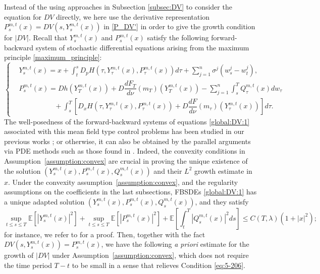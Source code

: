 \documentclass[11pt]{article}
\numberwithin{equation}{section}
\newcommand{\e}{\mathbb{E}}
\newcommand{\1}{\mbox{1\hspace{-1mm}I}}
\begin{document}
Instead of the using approaches in Subsection \ref{subsec:DV} to consider the equation for $DV$ directly, we here use the derivative representation $P^{m,t}_s(x)=DV\left(s,Y^{m,t}_s(x)\right)$ in \eqref{P_DV'} in order to give the growth condition for $|DV|$. Recall that $Y^{m,t}_s(x)$ and $P^{m,t}_s(x)$ satisfy the following forward-backward system of stochastic differential equations arising from the maximum principle \eqref{maximum_principle}:
\begin{equation}\label{global:DV:1}
    \left\{
    \begin{aligned}
        &Y^{m,t}_s(x)=x+\int_t^s D_{p}H\left(\tau,Y^{m,t}_\tau(x),P^{m,t}_\tau(x)\right)d\tau+\sum_{j=1}^{n}\sigma^{j} \left(w^{j}_s-w^{j}_t\right),\\
        &P^{m,t}_s(x)= Dh\left(Y^{m,t}_T(x)\right)+D\dfrac{dF_{T}}{d\nu}\left(m_T\right)\left(Y^{m,t}_T(x)\right) - \sum_{j=1}^{n}\int_s^T Q^{m,t}_\tau(x) dw_\tau\\
        &\quad\qquad\qquad +\int_s^T \left[D_{x}H\left(\tau,Y^{m,t}_\tau(x),P^{m,t}_\tau(x)\right)+D\dfrac{dF}{d\nu}\left(m_\tau\right)\left(Y^{m,t}_\tau(x)\right)\right] d\tau.
    \end{aligned}
    \right.
\end{equation}
The well-posedness of the forward-backward systems of equations \eqref{global:DV:1} associated with this mean field type control problems has been studied in our previous works \cite{AB10,AB5}; or otherwise, it can also be obtained by the parallel arguments via PDE methods such as those found in \cite{Delarue2002,Ma-Yong}. Indeed, the convexity conditions in Assumption~\ref{assumption:convex} are crucial in proving the unique existence of the solution $\left(Y^{m,t}_s(x),P^{m,t}_s(x),Q^{m,t}_s(x)\right)$ and their $L^2$ growth estimate in $x$. Under the convexity assumption~\ref{assumption:convex}, and the regularity assumptions on the coefficients in the last subsections, FBSDEs \eqref{global:DV:1} has a unique adapted solution $\left(Y^{m,t}_s(x),P^{m,t}_s(x),Q^{m,t}_s(x)\right)$, and they satisfy
\begin{equation*}\label{estimate:YPQ}
    \sup_{t\le s\le T}\e\left[\left| { Y^{m,t}_s(x)}\right|^2 \right] + \sup_{t\le s\le T}\e\left[\left| { P^{m,t}_s(x)}\right|^2\right]+\e\left[\int_t^T \left| { Q^{m,t}_s(x)}\right|^2 ds \right] \le C(T,\lambda)\left(1+|x|^2\right);
\end{equation*}
for instance, we refer to \cite[Section 8]{AB10} for a proof. Then, together with the fact $DV\left(s,Y^{m,t}_s(x)\right)=P^{m,t}_s(x)$, we have the following \textit{a priori} estimate for the growth of $|DV|$ under Assumption~\ref{assumption:convex}, which does not require the time period $T-t$ to be small in a sense that relieves Condition \eqref{eq:5-206}. 
\end{document}
